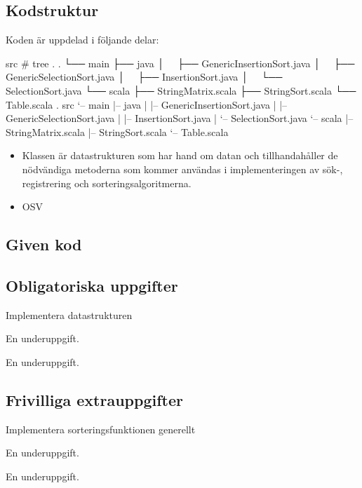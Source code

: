 \subsection{Kodstruktur}
Koden är uppdelad i följande delar:

\begin{REPL}
src # tree .
.
└── main
    ├── java
    │   ├── GenericInsertionSort.java
    │   ├── GenericSelectionSort.java
    │   ├── InsertionSort.java
    │   └── SelectionSort.java
    └── scala
        ├── StringMatrix.scala
        ├── StringSort.scala
        └── Table.scala
.
src
 `-- main
    |-- java
    |   |-- GenericInsertionSort.java
    |   |-- GenericSelectionSort.java
    |   |-- InsertionSort.java
    |   `-- SelectionSort.java
    `-- scala
        |-- StringMatrix.scala
        |-- StringSort.scala
        `-- Table.scala
\end{REPL}

\begin{itemize}
\item Klassen  är datastrukturen som har hand om datan och tillhandahåller de nödvändiga metoderna som kommer användas i implementeringen av sök-, registrering och sorteringsalgoritmerna.
\item OSV
\end{itemize}

\subsection{Given kod}


\subsection{Obligatoriska uppgifter}

\Task Implementera datastrukturen

\Subtask En underuppgift.

\Subtask En underuppgift.

\subsection{Frivilliga extrauppgifter}

\Task Implementera sorteringsfunktionen generellt

\Subtask En underuppgift.

\Subtask En underuppgift.
    